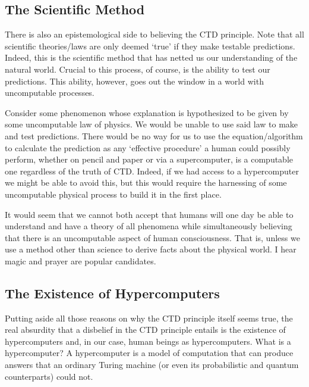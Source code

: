 \documentclass[11pt]{diazessay} %
\begin{document}
	\subsection{The Scientific Method}
		There is also an epistemological side to believing the CTD principle. Note that all scientific theories/laws are only deemed `true' if they make testable predictions. Indeed, this is the scientific method that has netted us our understanding of the natural world. Crucial to this process, of course, is the ability to test our predictions. This ability, however, goes out the window in a world with uncomputable processes.

		Consider some phenomenon whose explanation is hypothesized to be given by some uncomputable law of physics. We would be unable to use said law to make and test predictions. There would be no way for us to use the equation/algorithm to calculate the prediction as any `effective procedure' a human could possibly perform, whether on pencil and paper or via a supercomputer, is a computable one regardless of the truth of CTD. Indeed, if we had access to a hypercomputer we might be able to avoid this, but this would require the harnessing of some uncomputable physical process to build it in the first place.
		
		It would seem that we cannot both accept that humans will one day be able to understand and have a theory of all phenomena while simultaneously believing that there is an uncomputable aspect of human consciousness. That is, unless we use a method other than science to derive facts about the physical world. I hear magic and prayer are popular candidates.

		

	\subsection{The Existence of Hypercomputers}
		Putting aside all those reasons on why the CTD principle itself seems true, the real absurdity that a disbelief in the CTD principle entails is the existence of hypercomputers and, in our case, human beings as hypercomputers. What is a hypercomputer? A hypercomputer is a model of computation that can produce answers that an ordinary Turing machine (or even its probabilistic and quantum counterparts) could not.
		
\end{document}
